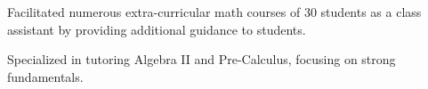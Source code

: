 \documentclass{cultvoucher}
\begin{document}
\begin{tightitemize}
	\item Facilitated numerous extra-curricular math courses of 30 students as a class assistant by providing additional guidance to students.
	\item Specialized in tutoring Algebra II and Pre-Calculus, focusing on strong fundamentals.
\end{tightitemize}
	
\end{document}
